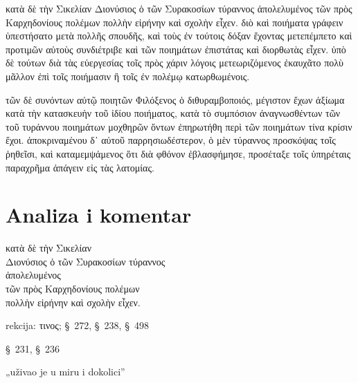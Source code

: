 {\large

\begin{greek}

\noindent κατὰ δὲ τὴν Σικελίαν Διονύσιος ὁ τῶν Συρακοσίων τύραννος ἀπολελυμένος τῶν πρὸς Καρχηδονίους πολέμων πολλὴν εἰρήνην καὶ σχολὴν εἶχεν. διὸ καὶ ποιήματα γράφειν ὑπεστήσατο μετὰ πολλῆς σπουδῆς, καὶ τοὺς ἐν τούτοις δόξαν ἔχοντας μετεπέμπετο καὶ προτιμῶν αὐτοὺς συνδιέτριβε καὶ τῶν ποιημάτων ἐπιστάτας καὶ διορθωτὰς εἶχεν. ὑπὸ δὲ τούτων διὰ τὰς εὐεργεσίας τοῖς πρὸς χάριν λόγοις μετεωριζόμενος ἐκαυχᾶτο πολὺ μᾶλλον ἐπὶ τοῖς ποιήμασιν ἢ τοῖς ἐν πολέμῳ κατωρθωμένοις.

τῶν δὲ συνόντων αὐτῷ ποιητῶν Φιλόξενος ὁ διθυραμβοποιός, μέγιστον ἔχων ἀξίωμα κατὰ τὴν κατασκευὴν τοῦ ἰδίου ποιήματος, κατὰ τὸ συμπόσιον ἀναγνωσθέντων τῶν τοῦ τυράννου ποιημάτων μοχθηρῶν ὄντων ἐπηρωτήθη περὶ τῶν ποιημάτων τίνα κρίσιν ἔχοι. ἀποκριναμένου δ᾽ αὐτοῦ παρρησιωδέστερον, ὁ μὲν τύραννος προσκόψας τοῖς ῥηθεῖσι, καὶ καταμεμψάμενος ὅτι διὰ φθόνον ἐβλασφήμησε, προσέταξε τοῖς ὑπηρέταις παραχρῆμα ἀπάγειν εἰς τὰς λατομίας.

\end{greek}

}


\section*{Analiza i komentar}



{\large
\begin{greek}
\noindent κατὰ δὲ τὴν Σικελίαν \\
Διονύσιος ὁ τῶν Συρακοσίων τύραννος \\
\tabto{2em} ἀπολελυμένος \\
\tabto{4em} τῶν πρὸς Καρχηδονίους πολέμων\\
πολλὴν εἰρήνην καὶ σχολὴν εἶχεν.\\

\end{greek}
}

\begin{description}[noitemsep,topsep=0pt]
\item[ἀπολελυμένος] rekcija: τινος; §~272, §~238, §~498
\item[εἶχεν] §~231, §~236
\item[εἰρήνην καὶ σχολὴν εἶχεν] „uživao je u miru i dokolici”

\end{description}

